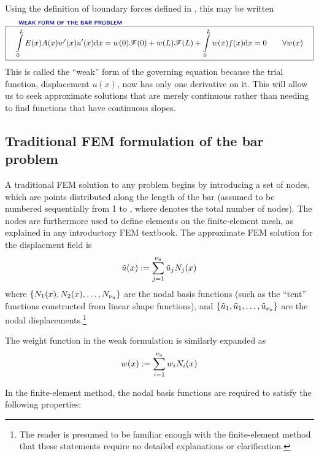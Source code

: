 Using the definition of boundary forces defined in , this may be written
\begin{equation}
\overset{\text{\Defn{WEAK FORM OF THE BAR PROBLEM}\hspace{8cm}}}{\boxit{\quad
 \int\limits_0^L E(x)A(x) w'(x)u'(x)\dd x = w(0)\tractionForce(0)+w(L)\tractionForce(L)  +  \int\limits_0^L w(x)f(x)\dd x=0
\qquad\forall w(x)
\quad}}
\label{eq:LinearBarWeakFormWithForcesc}
\end{equation}
This is called the ``weak'' form of the governing equation because the trial function, displacement $u(x)$, now has only one derivative on it. This will allow us to seek approximate solutions that are merely continuous rather than needing to find functions that have continuous slopes.



\subsection{Traditional FEM formulation of the bar problem}
\label{sec:LinearBarFEM}
A traditional FEM solution to any \oneD problem begins by introducing a set of nodes, which are points distributed along the length of the bar (assumed to be numbered sequentially from 1 to \numnodes, where \numnodes denotes the total number of nodes).  The nodes are furthermore used to define elements on the finite-element mesh, as explained in any introductory FEM textbook.   
The approximate FEM solution for the displacment field is
\begin{equation}
  \tilde{u}(x):=\sum\limits_{j=1}^{{\nu_\text{n}}}\tilde{u}_j {N}_j(x)
\label{eq:aprxuc}
\end{equation}
where $\{{N}_1(x),{N}_2(x),\ldots,{N}_{\nu_\text{n}}\}$ are the nodal basis functions (such as the ``tent'' functions constructed from linear shape functions), and $\{\tilde{u}_1, \tilde{u}_1, \ldots, \tilde{u}_{\nu_\text{n}}\}$  
are the nodal displacements.\footnote{The reader is presumed to be familiar enough with the finite-element method that these statements require no detailed explanations or clarification.}

The weight function in the weak formulation is similarly expanded as
\begin{equation}
  w(x):=\sum\limits_{i=1}^{{\nu_\text{n}}}w_i {N}_i(x)
\label{eq:weightc}
\end{equation}

In the finite-element method, the nodal basis functions are required to satisfy the following properties:

